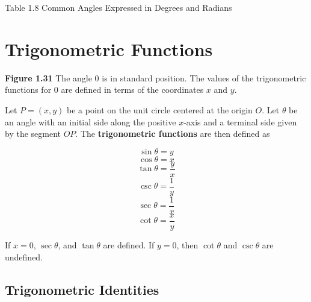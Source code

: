 \documentclass[12pt]{book}
\begin{document}
	Table 1.8 Common Angles Expressed in Degrees and Radians

\section{Trigonometric Functions}


	\textbf{Figure 1.31} The angle \(0\) is in standard position. The values of the trigonometric functions for \(0\) are defined in terms of the coordinates \(x\) and \(y\).

	\newpage 
Let \(P=(x,y)\) be a point on the unit circle centered at the origin \(O\). Let \(\theta\) be an angle with an initial side along the positive \(x\)-axis and a terminal side given by the segment \(OP\). The \textbf{trigonometric functions} are then defined as 

\[\sin\theta=y\]
\[\cos\theta=x\]
\[\tan\theta=\frac{y}{x}\]
\[\csc\theta=\frac{1}{y}\]
\[\sec\theta=\frac{1}{x}\]
\[\cot\theta=\frac{x}{y}\]

If \(x=0\), \(\sec\theta\), and \(\tan\theta\) are defined. If \(y=0\), then \(\cot\theta\) and \(\csc \theta\) are undefined. 

\subsection{Trigonometric Identities} 
\end{document}
